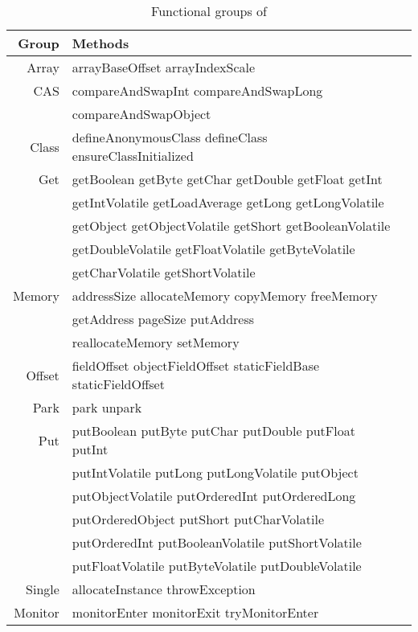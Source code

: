 
\begin{table}[ht]
\centering
\begin{tabular}{|r|l|l|} \hline
Group  & Methods \\ \hline \hline
Array  & arrayBaseOffset arrayIndexScale \\ \hline
CAS    & compareAndSwapInt compareAndSwapLong \\
       & compareAndSwapObject \\ \hline
Class  & defineAnonymousClass defineClass ensureClassInitialized \\ \hline
Get    & getBoolean getByte getChar getDouble getFloat getInt \\
       & getIntVolatile getLoadAverage getLong getLongVolatile \\
       & getObject getObjectVolatile getShort getBooleanVolatile \\
       & getDoubleVolatile getFloatVolatile getByteVolatile \\
       & getCharVolatile getShortVolatile \\ \hline
Memory & addressSize allocateMemory copyMemory freeMemory \\
       & getAddress pageSize putAddress \\ 
       & reallocateMemory setMemory \\ \hline
Offset & fieldOffset objectFieldOffset staticFieldBase staticFieldOffset \\ \hline
Park   & park unpark \\ \hline
Put    & putBoolean putByte putChar putDouble putFloat putInt \\
       & putIntVolatile putLong putLongVolatile putObject \\
       & putObjectVolatile putOrderedInt putOrderedLong \\
       & putOrderedObject putShort putCharVolatile \\ 
       & putOrderedInt putBooleanVolatile putShortVolatile \\ 
       & putFloatVolatile putByteVolatile putDoubleVolatile \\ \hline
Single & allocateInstance throwException \\ \hline
Monitor & monitorEnter monitorExit tryMonitorEnter \\ \hline

\end{tabular}
\caption{Functional groups of \smu{}}
\label{table:groups}
\end{table}



